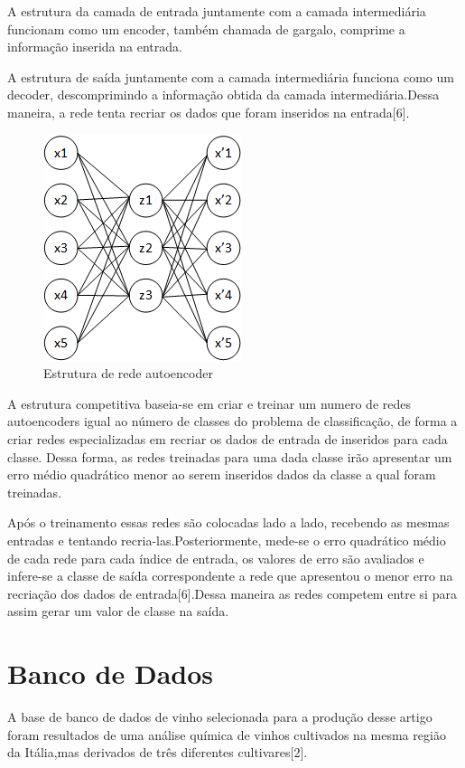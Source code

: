 A estrutura da camada de entrada juntamente com a camada intermediária funcionam como um encoder, também chamada de gargalo, comprime a informação inserida na entrada. 

A estrutura de saída juntamente com a camada intermediária funciona como um decoder, descomprimindo a informação obtida da camada intermediária.Dessa maneira, a rede  tenta recriar os dados que foram inseridos na entrada[6].
\begin{figure}[H]

\centering %
\includegraphics{04-Figuras/autoencoder}
\caption{Estrutura de rede autoencoder}

\label{figura:arquitetura}

\end{figure}

A estrutura competitiva baseia-se em criar e treinar um numero de redes autoencoders igual ao número de classes do problema de classificação, de forma a criar redes especializadas em recriar os dados de entrada de inseridos para cada classe. Dessa forma, as redes treinadas para uma dada classe irão apresentar um erro médio quadrático menor ao serem inseridos dados da classe a qual foram treinadas.

Após o treinamento essas redes são colocadas lado a lado, recebendo as mesmas entradas e tentando recria-las.Posteriormente, mede-se o erro quadrático médio de cada rede para cada índice de entrada, os valores de erro são avaliados e infere-se a classe de saída correspondente a rede que apresentou o menor erro na recriação dos dados de entrada[6].Dessa maneira as redes competem entre si para assim gerar um valor de classe na saída.


\section{Banco de Dados}
A base de banco de dados de vinho selecionada para a produção desse artigo foram resultados de uma análise química de vinhos cultivados na mesma região da Itália,mas derivados de três diferentes cultivares[2].

